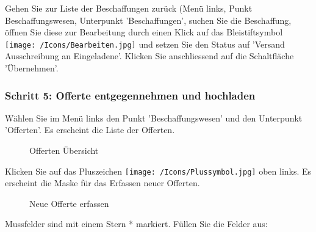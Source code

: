 Gehen Sie zur Liste der Beschaffungen zurück (Menü links, Punkt Beschaffungswesen, Unterpunkt 'Beschaffungen', suchen Sie die Beschaffung, öffnen Sie diese zur Bearbeitung durch einen Klick auf das Bleistiftsymbol \texttt{[image: /Icons/Bearbeiten.jpg]} und setzen Sie den Status auf 'Versand Ausschreibung an Eingeladene'. Klicken Sie anschliessend auf die Schaltfläche 'Übernehmen'.

\vspace{\baselineskip}

\subsubsection{Schritt 5: Offerte entgegennehmen und hochladen}

Wählen Sie im Menü links den Punkt 'Beschaffungswesen' und den Unterpunkt 'Offerten'. Es erscheint die Liste der Offerten.

\begin{figure}[H]
\caption{Offerten Übersicht}
\end{figure}

Klicken Sie auf das Pluszeichen \texttt{[image: /Icons/Plussymbol.jpg]}  oben links. Es erscheint die Maske für das Erfassen neuer Offerten.

\begin{figure}[H]
\caption{Neue Offerte erfassen}
\end{figure}


Mussfelder sind mit einem Stern * markiert. Füllen Sie die Felder aus:

